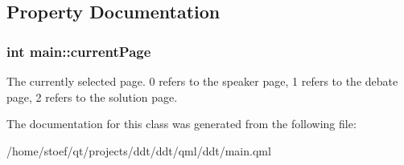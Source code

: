 \subsection{Property Documentation}
\hypertarget{classmain_a4ede4960616afa3a86ec26a159598ee6}{
\subsubsection[{current\-Page}]{\setlength{\rightskip}{0pt plus 5cm}int main\-::current\-Page}}\label{classmain_a4ede4960616afa3a86ec26a159598ee6}
The currently selected page. 0 refers to the speaker page, 1 refers to the debate page, 2 refers to the solution page. 

The documentation for this class was generated from the following file\-:\begin{DoxyCompactItemize}
\item 
/home/stoef/qt/projects/ddt/ddt/qml/ddt/main.\-qml\end{DoxyCompactItemize}
